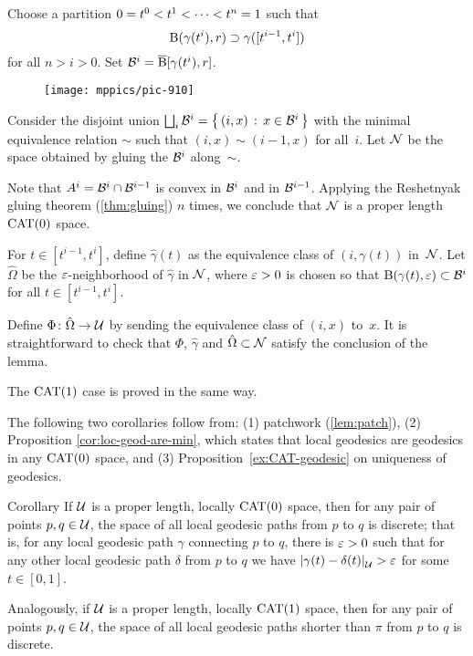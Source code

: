Choose a partition $0\z=t^0<t^1<\dots<t^n\z=1$ such that 
\[\mathrm{B}{}(\gamma(t^i),r)\supset \gamma([t^{i-1},t^i])\] for all $n>i>0$.
Set $\mathcal{B}^i=\overline{\mathrm{B}}{}[\gamma(t^i),r]$.

\begin{figure}[h!]
\vskip-0mm
\centering
\texttt{[image: mppics/pic-910]}
\end{figure}

Consider the disjoint union $\bigsqcup_i\mathcal{B}^i=\left\{\,{(i,x)}\,:\,{x\in\mathcal{B}^i}\,\right\}$ with the minimal equivalence relation $\sim$ such that $(i,x)\sim(i-1,x)$ for all~$i$.
Let  $\mathcal{N}$ be the space obtained by gluing the $\mathcal{B}^i$ along~$\sim$.

Note that $A^i=\mathcal{B}^i\cap\mathcal{B}^{i-1}$ is convex in $\mathcal{B}^i$ and in $\mathcal{B}^{i-1}$.
Applying the Reshetnyak gluing theorem (\ref{thm:gluing}) $n$ times, 
we conclude that $\mathcal{N}$ is a proper length $\mathrm{CAT}(0)$ space.

For $t\in[t^{i-1},t^i]$, define $\hat\gamma(t)$ as the equivalence class of $(i,\gamma(t))$ in~$\mathcal{N}$.
Let $\hat\Omega$ be the $\varepsilon$-neighborhood of $\hat\gamma$ in $\mathcal{N}$, where $\varepsilon>0$ is chosen so that $\mathrm{B}{}(\gamma(t),\varepsilon)\subset\mathcal{B}^i$ for all $t\in[t^{i-1},t^i]$.

Define $\Phi\colon\hat\Omega\to\mathcal{U}$
by sending the equivalence class of $(i,x)$ to~$x$.
It is straightforward to check that $\Phi$, 
$\hat\gamma$ and $\hat\Omega\subset\mathcal{N}$ satisfy the conclusion of  the lemma.

The $\mathrm{CAT}(1)$ case is proved in the same way.
\qeds

The following two corollaries follow from:
(1) patchwork (\ref{lem:patch}),
(2) Proposition \ref{cor:loc-geod-are-min}, which states that local geodesics are geodesics in any $\mathrm{CAT}(0)$ space, 
and (3) Proposition~\ref{ex:CAT-geodesic} on uniqueness of geodesics.

\begin{thm}{Corollary}\label{cor:discrete-paths}
If $\mathcal{U}$ is a proper length, locally $\mathrm{CAT}(0)$ space, then for any pair of points $p,q\in\mathcal{U}$, the space of all local geodesic paths from $p$ to $q$ is discrete;
that is, for any local geodesic path $\gamma$ connecting $p$ to $q$, there is $\varepsilon>0$ such that for any other local geodesic path $\delta$ from $p$ to $q$ we have
$\dist{\gamma(t)}{\delta(t)}{\spc{U}}>\eps$ for some $t\in[0,1]$.

Analogously, if $\mathcal{U}$ is a proper length, locally $\mathrm{CAT}(1)$ space, then for any pair of points $p,q\in\mathcal{U}$,  the space of all local geodesic paths shorter than $\pi$ from $p$ to $q$ is discrete.
\end{thm}

